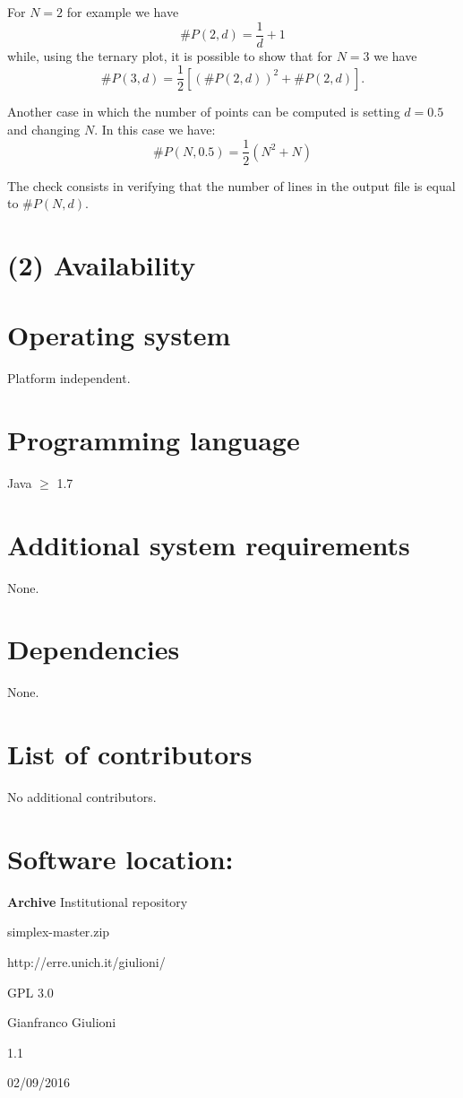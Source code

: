 \documentclass{jors}
\begin{document}
For $N=2$ for example we have
\[
	\#P(2,d)=\frac{1}{d}+1
\]
while, using the ternary plot, it is possible to show that for $N=3$ we have
\[
	\#P(3,d)=\frac{1}{2}\left[\left(\#P(2,d)\right)^2+\#P(2,d)\right].
\]

Another case in which the number of points can be computed is setting $d=0.5$ and changing $N$. In this case we have:
\[
	\#P(N,0.5)=\frac{1}{2}(N^2+N)
\]

The check consists in verifying that the number of lines in the output file is equal to $\#P(N,d)$. 


\section*{(2) Availability}
\vspace{0.5cm}
\section*{Operating system}
Platform independent.

\section*{Programming language}
Java $\ge$ 1.7

\section*{Additional system requirements}
None.

\section*{Dependencies}
None.

\section*{List of contributors}
No additional contributors.

\section*{Software location:}

{\bf Archive} Institutional repository 

\begin{description}[noitemsep,topsep=0pt]
	\item[Name:] simplex-master.zip
	\item[Persistent identifier:] http://erre.unich.it/giulioni/
	\item[Licence:] GPL 3.0
	\item[Publisher:]  Gianfranco Giulioni
	\item[Version published:] 1.1
	\item[Date published:] 02/09/2016
\end{description}
\end{document}
